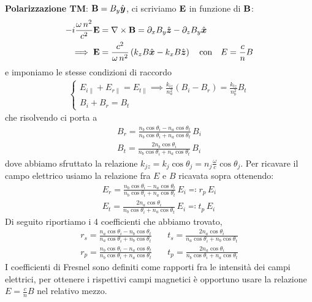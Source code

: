 \textbf{Polarizzazione TM}: $ \mathbf{B} = B_y \hat{\boldsymbol{y}} $, ci scriviamo $ \mathbf{E} $ in funzione di $ \mathbf{B} $:
\begin{align}
  -i \frac{\omega \, n^2}{c^2} \mathbf{E} &= \nabla \times \mathbf{B} = \partial_x B_y \hat{\boldsymbol{z}} - \partial_z B_y \hat{\boldsymbol{x}}
  \\
  \implies \mathbf{E} &= \frac{c^2}{\omega \, n^2} \left( k_z B \hat{\boldsymbol{x}} - k_x B \hat{\boldsymbol{z}} \right) \quad \textnormal{con} \quad E = \frac{c}{n} B
\end{align}
e imponiamo le stesse condizioni di raccordo
\begin{align}
  \begin{cases}
    E_{i\parallel} + E_{r\parallel} = E_{t\parallel} \implies \frac{k_{iz}}{n^2_a} \left( B_i - B_r \right) = \frac{k_{tz}}{n^2_b} B_t
    \\
    B_i + B_r = B_t 
  \end{cases}
\end{align}
che risolvendo ci porta a 
\begin{align}
  B_r = \frac{n_b \cos\theta_i - n_a \cos \theta_t }{n_b \cos\theta_i + n_a \cos \theta_t}\, B_i
  \\
  B_t = \frac{2 n_b \cos\theta_i}{n_b \cos\theta_i + n_a \cos \theta_t}\, B_i
\end{align}
dove abbiamo sfruttato la relazione $ k_{jz} = k_j \cos\theta_j = n_j \frac{\omega}{c} \cos \theta_j  $. Per ricavare il campo elettrico usiamo la relazione 
fra $ E $ e $ B $ ricavata sopra ottenendo: 
\begin{align}
  E_r = \frac{n_b \cos\theta_i - n_a \cos \theta_t }{n_b \cos\theta_i + n_a \cos \theta_t}\, E_i \eqcolon r_p \, E_i
  \\
  E_t = \frac{2 n_a \cos\theta_i}{n_b \cos\theta_i + n_a \cos \theta_t}\, E_i \eqcolon t_p \,E_i
\end{align}
Di seguito riportiamo i 4 coefficienti che abbiamo trovato,
\begin{align}
  {r_s = \frac{n_a \cos\theta_i - n_b \cos\theta_t}{n_a \cos\theta_i + n_b \cos\theta_t}} 
  \quad &{t_s = \frac{2 n_a \cos \theta_i}{n_a \cos\theta_i + n_b \cos\theta_t}}
  \\
  {r_p = \frac{n_b \cos\theta_i - n_a \cos \theta_t }{n_b \cos\theta_i + n_a \cos \theta_t}} 
  \quad &{t_p = \frac{2 n_a \cos\theta_i}{n_b \cos\theta_i + n_a \cos \theta_t}}
\end{align}
I coefficienti di Fresnel sono definiti come rapporti fra le intensità dei campi elettrici, per ottenere i rispettivi campi magnetici è opportuno usare la 
relazione $ E = \frac{c}{n} B $ nel relativo mezzo.

